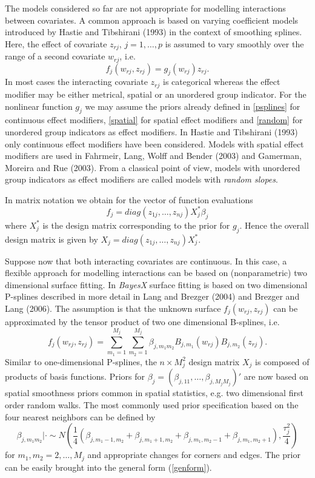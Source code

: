 \documentclass[11pt,a4paper,twoside]{bayesxarticle}
\begin{document}
The models considered so far are not appropriate for modelling
interactions between covariates. A common approach is based on
varying coefficient models introduced by Hastie and Tibshirani
(1993) in the context of smoothing splines. Here, the effect of
covariate $z_{rj}$, $j=1,\dots,p$ is assumed to vary smoothly over
the range of a second covariate $w_{rj}$, i.e.
\begin{equation}
\label{varcoeffterm} f_j(w_{rj},z_{rj}) = g_j(w_{rj}) z_{rj}.
\end{equation}
In most cases the interacting covariate $z_{rj}$ is categorical
whereas the effect modifier may be either metrical, spatial or an
unordered group indicator. For the nonlinear function $g_j$ we may
assume the priors already defined in \autoref{psplines} for
continuous effect modifiers, \autoref{spatial} for spatial effect
modifiers and \autoref{random} for unordered group indicators as
effect modifiers. In Hastie and Tibshirani (1993) only continuous
effect modifiers have been considered. Models with spatial effect
modifiers are used in Fahrmeir, Lang, Wolff and Bender (2003) and
Gamerman, Moreira and Rue (2003). From a classical point of view,
models with unordered group indicators as effect modifiers are
called models with {\em random slopes}.

In matrix notation we obtain for the vector of function
evaluations
$$
f_j = diag(z_{1j},\dots,z_{nj})  X_j^* \beta_j
$$
where $X_j^*$ is the design matrix corresponding to the prior for
$g_j$. Hence the overall design matrix is given by $X_j =
diag(z_{1j},\dots,z_{nj})  X_j^*$.

Suppose now that both interacting covariates are continuous. In this
case, a flexible approach for modelling interactions can be based on
(nonparametric) two dimensional surface fitting. In {\em BayesX}
surface fitting is based on two dimensional P-splines described in
more detail in Lang and Brezger (2004) and Brezger and Lang (2006).
The assumption is that the unknown surface $f_j(w_{rj},z_{rj})$ can
be approximated by the tensor product of two one dimensional
B-splines, i.e.
$$
f_{j}(w_{rj},z_{rj}) = \sum_{m_1=1}^{M_j} \sum_{m_2=1}^{M_j}
\beta_{j,m_1 m_2} B_{j, m_1}(w_{rj}) B_{j,m_2} (z_{rj}).
$$
Similar to one-dimensional P-splines, the $n \times M_j^2$ design
matrix $X_j$ is composed of products of basis functions. Priors
for $\beta_{j} = (\beta_{j,11},\dots,\beta_{j,M_jM_j})'$ are now
based on spatial smoothness priors common in spatial statistics,
e.g. two dimensional first order random walks. The most commonly
used prior specification based on the four nearest neighbors can
be defined by
\begin{equation}
\label{2dimrw1} \beta_{j, m_1 m_2} | \cdot \sim N \left(
\frac{1}{4} ( \beta_{j, m_1-1,m_2}+ \beta_{j, m_1+1,m_2} +
\beta_{j, m_1,m_2-1} +\beta_{j, m_1,m_2+1}),\frac{\tau^2_{j}}{4}
\right)
\end{equation}
for $m_1,m_2=2,\dots,M_j$ and appropriate changes for corners and
edges. The prior can be easily brought into the general form
(\ref{genform}).
\end{document}
